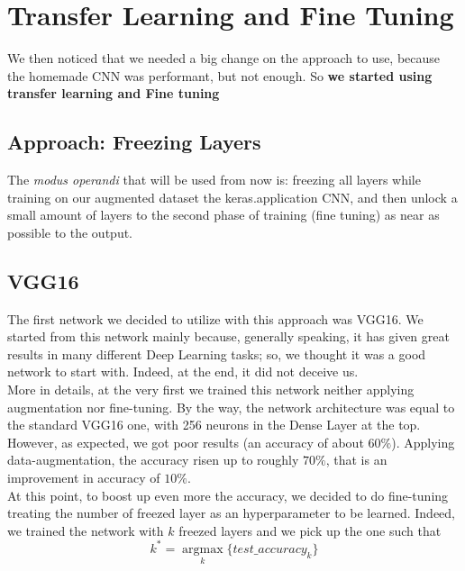 \documentclass[10pt]{article}
\begin{document}
\section{Transfer Learning and Fine Tuning}
We then noticed that we needed a big change on the approach to use, because the homemade
CNN was performant, but not enough. So \textbf{we started using transfer learning and Fine tuning}

\subsection{Approach: Freezing Layers}
The \textit{modus operandi} that will be used from now is: freezing all layers while training on our augmented dataset the keras.application
CNN, and then unlock a small amount of layers to the second phase of training (fine tuning) as near as possible to the output.
\subsection{VGG16}
The first network we decided to utilize with this approach was VGG16. We started from this network mainly because, generally speaking, it has given great results in many different Deep Learning tasks; so, we thought it was a good network to start with. Indeed, at the end, it did not deceive us.\\[0.1cm] More in details, at the very first we trained this network neither applying augmentation nor fine-tuning. By the way, the network architecture was equal to the standard VGG16 one, with 256 neurons in the Dense Layer at the top. However, as expected, we got poor results (an accuracy of about $60\%$). Applying data-augmentation, the accuracy risen up to roughly $70\%$, that is an improvement in accuracy of $10\%$.\\[0.1cm]
At this point, to boost up even more the accuracy, we decided to do fine-tuning treating the number of freezed layer as an hyperparameter to be learned. Indeed, we trained the network with $k$ freezed layers and we pick up the one such that
\begin{equation*}
    k^* = \underset{k}{\operatorname{argmax}}\{test\_accuracy_{k}\}
\end{equation*}
\end{document}
